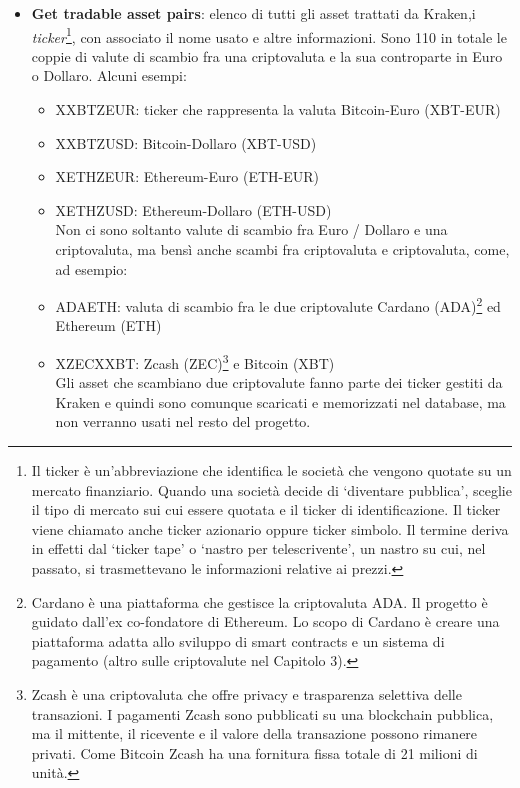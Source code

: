 \documentclass[a4paper,12pt]{report}
\begin{document}
\begin{itemize}
	\item \textbf{Get tradable asset pairs}: elenco di tutti gli asset trattati da Kraken,i \textit{ticker}\footnote{Il ticker è un’abbreviazione che identifica le società che vengono quotate su un mercato finanziario. Quando una società decide di ‘diventare pubblica’, sceglie il tipo di mercato sui cui essere quotata e il ticker di identificazione. Il ticker viene chiamato anche ticker azionario oppure ticker simbolo. Il termine deriva in effetti dal ‘ticker tape’ o ‘nastro per telescrivente’, un nastro su cui, nel passato, si trasmettevano le informazioni relative ai prezzi.}, con associato il nome usato e altre informazioni. Sono 110 in totale le coppie di valute di scambio fra una criptovaluta e la sua controparte in Euro o Dollaro. Alcuni esempi:
	\begin{itemize}
		\item XXBTZEUR: ticker che rappresenta la valuta Bitcoin-Euro (XBT-EUR)
		\item XXBTZUSD: Bitcoin-Dollaro (XBT-USD)
		\item XETHZEUR: Ethereum-Euro (ETH-EUR)
		\item XETHZUSD: Ethereum-Dollaro (ETH-USD)\\
		
		Non ci sono soltanto valute di scambio fra Euro / Dollaro e una criptovaluta, ma bensì anche scambi fra criptovaluta e criptovaluta, come, ad esempio:
		\item ADAETH: valuta di scambio fra le due criptovalute Cardano (ADA)\footnote{Cardano è una piattaforma che gestisce la criptovaluta ADA. Il progetto è guidato dall'ex co-fondatore di Ethereum. Lo scopo di Cardano è creare una piattaforma adatta allo sviluppo di smart contracts e un sistema di pagamento (altro sulle criptovalute nel Capitolo 3).} ed Ethereum (ETH)
		\item XZECXXBT: Zcash (ZEC)\footnote{Zcash è una criptovaluta che offre privacy e trasparenza selettiva delle transazioni. I pagamenti Zcash sono pubblicati su una blockchain pubblica, ma il mittente, il ricevente e il valore della transazione possono rimanere privati. Come Bitcoin Zcash ha una fornitura fissa totale di 21 milioni di unità.} e Bitcoin (XBT)\\
		
		Gli asset che scambiano due criptovalute fanno parte dei ticker gestiti da Kraken e quindi sono comunque scaricati e memorizzati nel database, ma non verranno usati nel resto del progetto.
		

\end{itemize}
\end{itemize}
\end{document}
